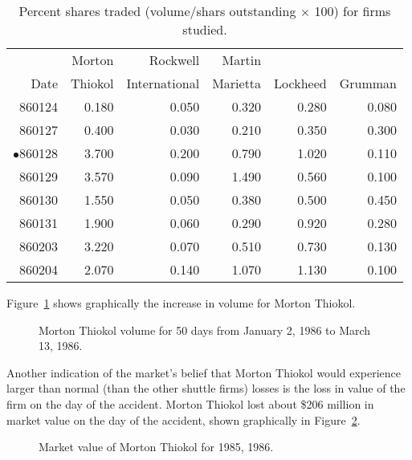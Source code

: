 \begin{table}[htbp]
\caption{Percent shares traded (volume/shars outstanding
$\times$ 100) for firms studied.}
\begin{tabular*}{6in}{r@{\extracolsep{1em}}rrrrr}
\hline\hline       
       &  Morton & Rockwell & Martin &          &         \\
Date   &  Thiokol & International & Marietta & Lockheed & Grumman \\
\hline
860124 &   0.180 &   0.050 &   0.320 &   0.280 &   0.080  \\
860127 &   0.400 &   0.030 &   0.210 &   0.350 &   0.300  \\
$\bullet$860128 &   3.700 &   0.200 &   0.790 &   1.020 &   0.110  \\
860129 &   3.570 &   0.090 &   1.490 &   0.560 &   0.100  \\
860130 &   1.550 &   0.050 &   0.380 &   0.500 &   0.450  \\
860131 &   1.900 &   0.060 &   0.290 &   0.920 &   0.280  \\
860203 &   3.220 &   0.070 &   0.510 &   0.730 &   0.130  \\
860204 &   2.070 &   0.140 &   1.070 &   1.130 &   0.100  \\ \hline
\end{tabular*}
\label{percenttraded}
\end{table}

Figure~\ref{thvol} shows graphically the increase in volume
for Morton Thiokol.

\begin{figure}[hp]
\begin{center}

\end{center}
\caption{Morton Thiokol volume for 50 days from January 2,
1986 to March 13, 1986.}
\label{thvol}
\end{figure}


Another indication of the market's belief that Morton
Thiokol would experience larger than normal (than the other
shuttle firms) losses is the loss in value of the firm on
the day of the accident.
Morton Thiokol lost about \$206 million in market value on
the day of the accident, shown graphically in
Figure~\ref{thval}.

\begin{figure}[hp]
\begin{center}

\end{center}
\caption{Market value of Morton Thiokol for 1985, 1986.}
\label{thval}
\end{figure}

